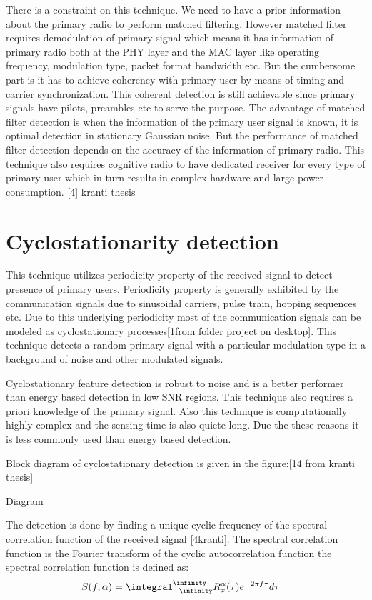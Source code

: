 There is a constraint on this technique. We need to have a prior information 
about the primary radio to perform matched filtering. However matched filter 
requires demodulation of primary signal which means it has information of 
primary radio both at the PHY layer and the MAC layer like operating frequency, 
modulation type, packet format bandwidth etc. But the cumbersome part is it has 
to achieve coherency with primary user by means of timing and carrier 
synchronization. This coherent detection is still achievable since primary 
signals have pilots, preambles etc to serve the purpose. 
The advantage of matched filter detection is when the information of the primary
user signal is known, it is optimal detection in stationary Gaussian noise. But 
the performance of matched filter detection depends on the accuracy of the 
information of primary radio. This technique also requires cognitive radio to 
have dedicated receiver for every type of primary user which in turn results in 
complex hardware and large power consumption. [4] kranti thesis

\section{Cyclostationarity detection}

This technique utilizes periodicity property of the received signal to detect 
presence of primary users. Periodicity property is generally exhibited by the 
communication signals due to sinusoidal carriers, pulse train, hopping sequences
etc. Due to this underlying periodicity most of the communication signals can be
modeled as cyclostationary processes[1from folder project on desktop]. This 
technique detects a random primary signal with a particular modulation type in a
background of noise and other modulated signals.

Cyclostationary feature detection is robust to noise and is a better performer 
than energy based detection in low SNR regions. This technique also requires a 
priori knowledge of the primary signal. Also this technique is computationally 
highly complex and the sensing time is also quiete long. Due the these reasons 
it is less commonly used than energy based detection.

Block diagram of cyclostationary detection is given in the figure:[14 from 
kranti thesis]


Diagram 

The detection is done by finding a unique cyclic frequency of the spectral 
correlation function of the received signal [4kranti]. The spectral correlation 
function is the Fourier transform of the cyclic autocorrelation function the 
spectral correlation function is defined as:
\begin{align}
    S(f,\alpha) &= \integral_{-\infinity}^{\infinity} R_{x}^{\alpha}(\tau)e^{-2\pi{}f\tau}d\tau \nonumber
\end{align}

